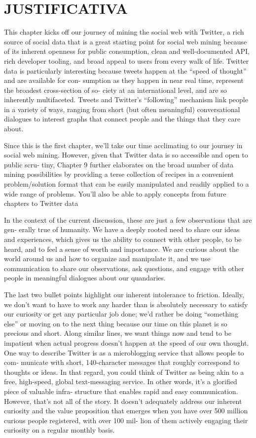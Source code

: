 \section{JUSTIFICATIVA}\label{sec:justificativa}
This chapter kicks off our journey of mining the social web with Twitter, a rich source of social data that is a great starting point for social web mining because of its inherent openness for public consumption, clean and well-documented API, rich developer tooling, and broad appeal to users from every walk of life. Twitter data is particularly interesting because tweets happen at the “speed of thought” and are available for con‐ sumption as they happen in near real time, represent the broadest cross-section of so‐ ciety at an international level, and are so inherently multifaceted. Tweets and Twitter’s “following” mechanism link people in a variety of ways, ranging from short (but often meaningful) conversational dialogues to interest graphs that connect people and the things that they care about.

Since this is the first chapter, we’ll take our time acclimating to our journey in social web mining. However, given that Twitter data is so accessible and open to public scru‐ tiny, Chapter 9 further elaborates on the broad number of data mining possibilities by providing a terse collection of recipes in a convenient problem/solution format that can be easily manipulated and readily applied to a wide range of problems. You’ll also be able to apply concepts from future chapters to Twitter data

In the context of the current discussion, these are just a few observations that are gen‐ erally true of humanity. We have a deeply rooted need to share our ideas and experiences, which gives us the ability to connect with other people, to be heard, and to feel a sense of worth and importance. We are curious about the world around us and how to organize and manipulate it, and we use communication to share our observations, ask questions, and engage with other people in meaningful dialogues about our quandaries.

The last two bullet points highlight our inherent intolerance to friction. Ideally, we don’t want to have to work any harder than is absolutely necessary to satisfy our curiosity or get any particular job done; we’d rather be doing “something else” or moving on to the next thing because our time on this planet is so precious and short. Along similar lines, we want things now and tend to be impatient when actual progress doesn’t happen at the speed of our own thought.
One way to describe Twitter is as a microblogging service that allows people to com‐ municate with short, 140-character messages that roughly correspond to thoughts or ideas. In that regard, you could think of Twitter as being akin to a free, high-speed, global text-messaging service. In other words, it’s a glorified piece of valuable infra‐ structure that enables rapid and easy communication. However, that’s not all of the story. It doesn’t adequately address our inherent curiosity and the value proposition that emerges when you have over 500 million curious people registered, with over 100 mil‐ lion of them actively engaging their curiosity on a regular monthly basis.

